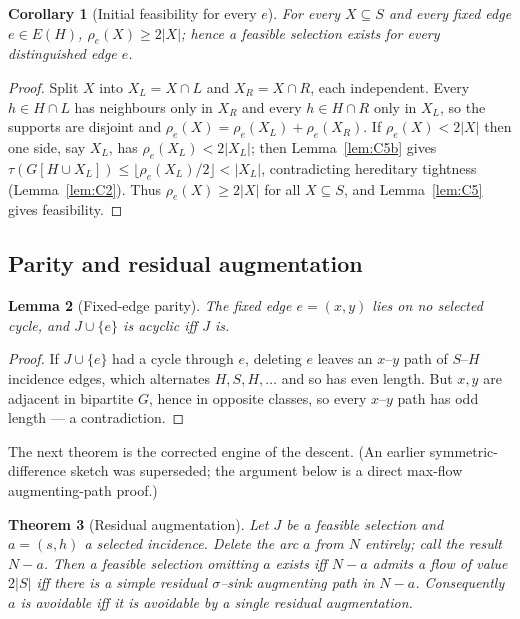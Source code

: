 \documentclass[11pt]{article}
\theoremstyle{plain}
\newtheorem{theorem}{Theorem}[section]
\newtheorem{lemma}[theorem]{Lemma}
\newtheorem{corollary}[theorem]{Corollary}
\theoremstyle{definition}
\newcommand{\FVS}{\tau}
\begin{document}
\begin{corollary}[Initial feasibility for every $e$]\label{cor:feasible}
For every $X\subseteq S$ and every fixed edge $e\in E(H)$, $\rho_e(X)\ge2|X|$;
hence a feasible selection exists for every distinguished edge $e$.
\end{corollary}

\begin{proof}
Split $X$ into $X_L=X\cap L$ and $X_R=X\cap R$, each independent. Every $h\in
H\cap L$ has neighbours only in $X_R$ and every $h\in H\cap R$ only in $X_L$, so
the supports are disjoint and $\rho_e(X)=\rho_e(X_L)+\rho_e(X_R)$. If
$\rho_e(X)<2|X|$ then one side, say $X_L$, has $\rho_e(X_L)<2|X_L|$; then
Lemma~\ref{lem:C5b} gives
$\FVS(G[H\cup X_L])\le\lfloor\rho_e(X_L)/2\rfloor<|X_L|$, contradicting
hereditary tightness (Lemma~\ref{lem:C2}). Thus $\rho_e(X)\ge2|X|$ for all
$X\subseteq S$, and Lemma~\ref{lem:C5} gives feasibility.
\end{proof}

\subsection{Parity and residual augmentation}\label{sub:C4}

\begin{lemma}[Fixed-edge parity]\label{lem:C3}
The fixed edge $e=(x,y)$ lies on no selected cycle, and $J\cup\{e\}$ is acyclic
iff $J$ is.
\end{lemma}

\begin{proof}
If $J\cup\{e\}$ had a cycle through $e$, deleting $e$ leaves an $x$--$y$ path of
$S$--$H$ incidence edges, which alternates $H,S,H,\dots$ and so has even length.
But $x,y$ are adjacent in bipartite $G$, hence in opposite classes, so every
$x$--$y$ path has odd length --- a contradiction.
\end{proof}

The next theorem is the corrected engine of the descent. (An earlier
symmetric-difference sketch was superseded; the argument below is a direct
max-flow augmenting-path proof.)

\begin{theorem}[Residual augmentation]\label{thm:C4}
Let $J$ be a feasible selection and $a=(s,h)$ a selected incidence. Delete the arc
$a$ from $N$ entirely; call the result $N-a$. Then a feasible selection omitting
$a$ exists iff $N-a$ admits a flow of value $2|S|$ iff there is a simple residual
$\sigma$--sink augmenting path in $N-a$. Consequently $a$ is avoidable iff it is
avoidable by a single residual augmentation.
\end{theorem}
\end{document}
